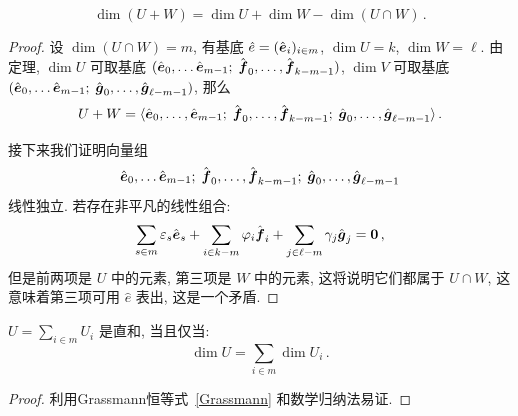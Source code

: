 \documentclass[openany, a5paper, oneside]{ctexbook}
\begin{document}
\begin{theorem}\label{Grassmann}
\begin{equation*}
	\dim (U + W) = \dim U + \dim W - \dim (U \cap W)\,.
\end{equation*}
\end{theorem}
\begin{proof}
	设 $\dim (U \cap W) = m$, 有基底 $\hat e = (\hat{\boldsymbol{e}}_i)_{i \in m}$, $\dim U = k$, $\dim W = \ell$. 
	由定理, $\dim U$ 可取基底 $(\hat{\boldsymbol{e}}_0, \ldots \hat{\boldsymbol{e}}_{m-1};\; \hat{\boldsymbol{f}}_0, \ldots, \hat{\boldsymbol{f}}_{k - m - 1})$, $\dim V$ 可取基底 $(\hat{\boldsymbol{e}}_0, \ldots \hat{\boldsymbol{e}}_{m-1};\; \hat{\boldsymbol{g}}_0, \ldots, \hat{\boldsymbol{g}}_{\ell - m - 1})$, 那么
	\begin{equation*}
		U + W = \langle
			\hat{\boldsymbol{e}}_0, \ldots, \hat{\boldsymbol{e}}_{m-1};\;
			\hat{\boldsymbol{f}}_0, \ldots, \hat{\boldsymbol{f}}_{k - m - 1};\;
			\hat{\boldsymbol{g}}_0, \ldots, \hat{\boldsymbol{g}}_{\ell - m - 1}
		\rangle\,.
	\end{equation*}

	接下来我们证明向量组
	\begin{equation*}
		\hat{\boldsymbol{e}}_0, \ldots \hat{\boldsymbol{e}}_{m-1};\;
		\hat{\boldsymbol{f}}_0, \ldots, \hat{\boldsymbol{f}}_{k - m - 1};\;
		\hat{\boldsymbol{g}}_0, \ldots, \hat{\boldsymbol{g}}_{\ell - m - 1}
	\end{equation*}
	线性独立. 若存在非平凡的线性组合:
	\begin{equation*}
		\sum_{s \in m} \varepsilon_s \hat{\boldsymbol{e}}_s 
			+ \sum_{i \in k - m} \varphi_i \hat{\boldsymbol{f}}_i
			+ \sum_{j \in \ell - m} \gamma_j \hat{\boldsymbol{g}}_j
		= \boldsymbol{0}\,,
	\end{equation*}
	但是前两项是 $U$ 中的元素, 第三项是 $W$ 中的元素, 这将说明它们都属于 $U \cap W$, 这意味着第三项可用 $\hat e$ 表出, 这是一个矛盾.
\end{proof}

\begin{corollary}
	$U = \sum_{i \in m} U_i$ 是直和, 当且仅当:
	\begin{equation*}
		\dim U = \sum_{i \in m} \dim U_i\,.
	\end{equation*}
\end{corollary}
\begin{proof}
	利用Grassmann恒等式~\ref{Grassmann} 和数学归纳法易证.
\end{proof}
\end{document}
